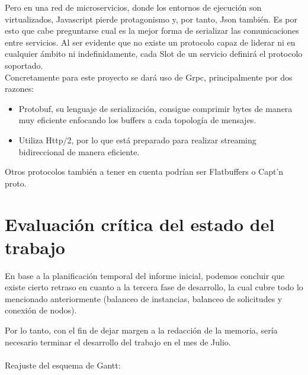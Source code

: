 \documentclass[11pt]{article}
\begin{document}
			Pero en una red de microservicios, donde los entornos de ejecución son virtualizados, Javascript pierde protagonismo y, por tanto, Json también.
			Es por esto que cabe preguntarse cual es la mejor forma de serializar las comunicaciones entre servicios. Al ser evidente que no existe un protocolo capaz de
			liderar ni en cualquier ámbito ni indefinidamente, cada Slot de un servicio definirá el protocolo soportado. \\

			Concretamente para este proyecto se dará uso de Grpc, principalmente por dos razones:
			\begin{itemize}
				\item Protobuf, su lenguaje de serialización, consigue comprimir bytes de manera muy eficiente enfocando los buffers a cada topología de mensajes.
				\item Utiliza Http/2, por lo que está preparado para realizar streaming bidireccional de manera eficiente.
			\end{itemize}
			Otros protocolos también a tener en cuenta podrían ser Flatbuffers o Capt'n proto.

	\section{Evaluación crítica del estado del trabajo}
		En base a la planificación temporal del informe inicial, podemos concluir que existe cierto retraso en cuanto a la tercera 
		fase de desarrollo, la cual cubre todo lo mencionado anteriormente (balanceo de instancias, balanceo de solicitudes y conexión de nodos).

		Por lo tanto, con el fin de dejar margen a la redacción de la memoria, sería necesario terminar el desarrollo del trabajo en el mes de Julio. \\
		\\Reajuste del esquema de Gantt:
\end{document}
